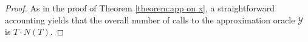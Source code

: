 \documentclass[a4paper,12pt]{article}
\DeclareMathOperator*{\argmin}{arg\,min}
\newcommand{\mY}{\mathcal{Y}}
\newcommand{\mX}{\mathcal{X}}
\newcommand{\tS}{\tilde{S}}
\begin{document}
\begin{proof}

As in the proof of Theorem \ref{theorem:app on x}, a straightforward accounting yields that the overall number of calls to the approximation oracle $\mY$ is $T\cdot{}N(T)$.
\end{proof}
\end{document}
